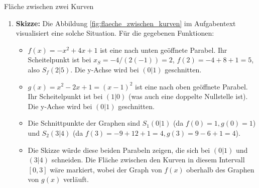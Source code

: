 \begin{loesungsumgebung}{Fläche zwischen zwei Kurven}
\begin{enumerate}[label=(\alph*)]
    \item \textbf{Skizze:}
    Die Abbildung \ref{fig:flaeche_zwischen_kurven} im Aufgabentext visualisiert eine solche Situation. Für die gegebenen Funktionen:
    \begin{itemize}
        \item $f(x) = -x^2 + 4x + 1$ ist eine nach unten geöffnete Parabel. Ihr Scheitelpunkt ist bei $x_S = -4/(2(-1)) = 2$, $f(2) = -4+8+1=5$, also $S_f(2|5)$. Die y-Achse wird bei $(0|1)$ geschnitten.
        \item $g(x) = x^2 - 2x + 1 = (x-1)^2$ ist eine nach oben geöffnete Parabel. Ihr Scheitelpunkt ist bei $(1|0)$ (was auch eine doppelte Nullstelle ist). Die y-Achse wird bei $(0|1)$ geschnitten.
        \item Die Schnittpunkte der Graphen sind $S_1(0|1)$ (da $f(0)=1, g(0)=1$) und $S_2(3|4)$ (da $f(3)=-9+12+1=4, g(3)=9-6+1=4$).
        \item Die Skizze würde diese beiden Parabeln zeigen, die sich bei $(0|1)$ und $(3|4)$ schneiden. Die Fläche zwischen den Kurven in diesem Intervall $[0,3]$ wäre markiert, wobei der Graph von $f(x)$ oberhalb des Graphen von $g(x)$ verläuft.
    \end{itemize}
\end{enumerate}

\end{loesungsumgebung}


